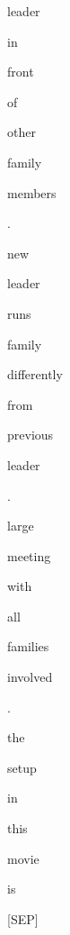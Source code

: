 \documentclass[varwidth=150mm]{standalone}
\begin{document}
\begin{CJK*}{UTF8}{gbsn}
{{{\colorbox{red!6.733155727386475}{\strut leader} \colorbox{red!0.0}{\strut in} \colorbox{red!0.0}{\strut front} \colorbox{red!0.0}{\strut of} \colorbox{red!0.0}{\strut other} \colorbox{red!9.248589515686035}{\strut family} \colorbox{red!1.2510132789611816}{\strut members} \colorbox{red!8.017692565917969}{\strut .} \colorbox{red!2.610250949859619}{\strut new} \colorbox{red!6.446208953857422}{\strut leader} \colorbox{red!4.228621959686279}{\strut runs} \colorbox{red!16.409564971923828}{\strut family} \colorbox{red!2.5009686946868896}{\strut differently} \colorbox{red!1.0854581594467163}{\strut from} \colorbox{red!2.412322998046875}{\strut previous} \colorbox{red!6.631526470184326}{\strut leader} \colorbox{red!11.22268295288086}{\strut .} \colorbox{red!2.367851972579956}{\strut large} \colorbox{red!3.4676082134246826}{\strut meeting} \colorbox{red!0.0}{\strut with} \colorbox{red!2.1961419582366943}{\strut all} \colorbox{red!15.654434204101562}{\strut families} \colorbox{red!1.3026036024093628}{\strut involved} \colorbox{red!4.589616298675537}{\strut .} \colorbox{red!17.417861938476562}{\strut the} \colorbox{red!31.812488555908203}{\strut setup} \colorbox{red!3.1981801986694336}{\strut in} \colorbox{red!7.796529769897461}{\strut this} \colorbox{red!14.120704650878906}{\strut movie} \colorbox{red!24.725543975830078}{\strut is} \colorbox{red!3.6120033264160156}{\strut [SEP]}
}}}
\end{CJK*}
\end{document}
